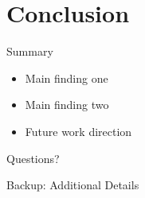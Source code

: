 \documentclass[aspectratio=169,12pt]{beamer}
\begin{document}
\section{Conclusion}

\begin{frame}{Summary}
  \begin{itemize}
    \item Main finding one
    \item Main finding two
    \item Future work direction
  \end{itemize}
\end{frame}

\begin{frame}[standout]
  Questions?
\end{frame}

\appendix

\begin{frame}{Backup: Additional Details}
\end{frame}
\end{document}
